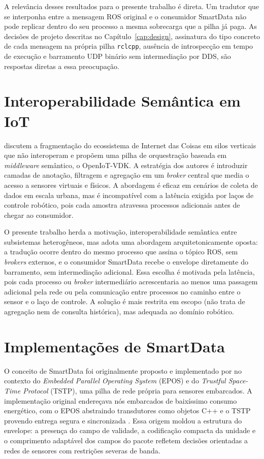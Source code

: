 \documentclass[
    12pt,
    oneside,
    a4paper,
    chapter=TITLE,
    section=TITLE,
    english,
    brazil
]{abntex2}
\begin{document}
A relevância desses resultados para o presente trabalho é direta. Um
tradutor que se interponha entre a mensagem ROS original e o consumidor
SmartData não pode replicar dentro do seu processo a mesma
sobrecarga que a pilha já paga. As decisões de projeto descritas
no Capítulo~\ref{cap:design}, assinatura do tipo concreto de cada mensagem na própria pilha
\texttt{rclcpp}, ausência de introspecção em tempo de execução e
barramento UDP binário sem intermediação por DDS, são respostas
diretas a essa preocupação.

\section{Interoperabilidade Semântica em IoT}
\label{sec:rel-semantic}

 discutem a fragmentação do ecossistema de
Internet das Coisas em silos verticais que não interoperam e propõem uma
pilha de orquestração baseada em \textit{middleware} semântico, o
OpenIoT-VDK. A estratégia dos autores é introduzir camadas de
anotação, filtragem e agregação em um \textit{broker} central que media
o acesso a sensores virtuais e físicos. A abordagem é eficaz em cenários
de coleta de dados em escala urbana, mas é incompatível com a latência
exigida por laços de controle robótico, pois cada amostra atravessa
processos adicionais antes de chegar ao consumidor.

O presente trabalho herda a motivação, interoperabilidade semântica
entre subsistemas heterogêneos, mas adota uma abordagem
arquitetonicamente oposta: a tradução ocorre dentro do mesmo processo
que assina o tópico ROS, sem \textit{brokers} externos, e o consumidor
SmartData recebe o envelope diretamente do barramento, sem intermediação
adicional. Essa escolha é motivada pela latência, pois cada processo ou
\textit{broker} intermediário acrescentaria ao menos uma passagem
adicional pela rede ou pela comunicação entre processos no caminho entre
o sensor e o laço de controle. A solução é mais restrita em escopo (não trata de agregação
nem de consulta histórica), mas adequada ao domínio robótico.

\section{Implementações de SmartData}
\label{sec:rel-smartdata}

O conceito de SmartData foi originalmente proposto e implementado por
 no contexto do \textit{Embedded
Parallel Operating System} (EPOS) e do \textit{Trustful Space-Time
Protocol} (TSTP), uma pilha de rede própria para sensores embarcados. A
implementação original endereçava nós embarcados de baixíssimo consumo
energético, com o EPOS abstraindo transdutores como objetos C++ e o TSTP
provendo entrega segura e sincronizada \cite{resner2015tstp}. Essa origem
moldou a estrutura do envelope: a presença do campo de validade, a
codificação compacta da unidade e o comprimento adaptável dos campos do
pacote refletem decisões orientadas a redes de sensores com restrições
severas de banda.
\end{document}
